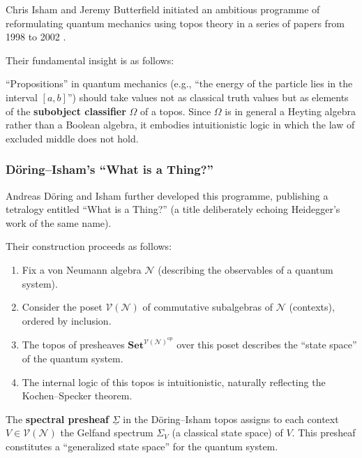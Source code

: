 \documentclass[12pt,a4paper]{article}
\theoremstyle{definition}
\newcommand{\Set}{\mathbf{Set}}
\begin{document}
Chris Isham and Jeremy Butterfield initiated an ambitious programme of reformulating quantum mechanics using topos theory in a series of papers from 1998 to 2002 \cite{IshamButterfield1998, IshamButterfield1999, IshamButterfield2000, IshamButterfield2002}.

Their fundamental insight is as follows:

\begin{keyinsight}
``Propositions'' in quantum mechanics (e.g., ``the energy of the particle lies in the interval $[a,b]$'') should take values not as classical truth values but as elements of the \textbf{subobject classifier} $\Omega$ of a topos. Since $\Omega$ is in general a Heyting algebra rather than a Boolean algebra, it embodies intuitionistic logic in which the law of excluded middle does not hold.
\end{keyinsight}

\subsubsection{D\"{o}ring--Isham's ``What is a Thing?''}

Andreas D\"{o}ring and Isham further developed this programme, publishing a tetralogy entitled ``What is a Thing?'' \cite{DoeringIsham2008a, DoeringIsham2008b, DoeringIsham2008c, DoeringIsham2008d} (a title deliberately echoing Heidegger's work of the same name).

Their construction proceeds as follows:

\begin{enumerate}[leftmargin=2em]
  \item Fix a von Neumann algebra $\mathcal{N}$ (describing the observables of a quantum system).
  \item Consider the poset $\mathcal{V}(\mathcal{N})$ of commutative subalgebras of $\mathcal{N}$ (contexts), ordered by inclusion.
  \item The topos of presheaves $\Set^{\mathcal{V}(\mathcal{N})^{\mathrm{op}}}$ over this poset describes the ``state space'' of the quantum system.
  \item The internal logic of this topos is intuitionistic, naturally reflecting the Kochen--Specker theorem.
\end{enumerate}

The \textbf{spectral presheaf} $\underline{\Sigma}$ in the D\"{o}ring--Isham topos assigns to each context $V \in \mathcal{V}(\mathcal{N})$ the Gelfand spectrum $\Sigma_V$ (a classical state space) of $V$. This presheaf constitutes a ``generalized state space'' for the quantum system.
\end{document}
